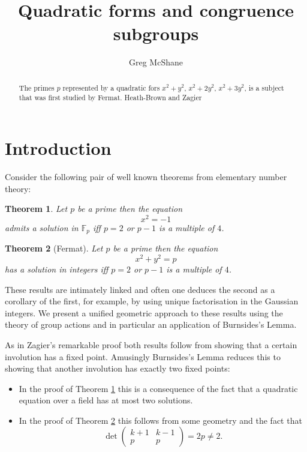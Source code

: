 \documentclass[12pt,a4paper]{amsart}
\title{Quadratic forms and  congruence subgroups}
\author[McShane]{Greg McShane}
\newtheorem{thm}{Theorem}[section]
\def\fp{\mathbb{F}_p}
\begin{document}
\maketitle

\begin{abstract} 
	The  primes $p$  represented by a quadratic fors 
	$x^2 + y^2$, 
	$x^2 + 2y^2$, 
	$x^2 + 3y^2$, 
	is a subject that was first  studied by Fermat. 
	Heath-Brown and Zagier 
\end{abstract} 


\section{Introduction}

Consider the following pair of well known theorems from elementary number theory:


\begin{thm}\label{triv}
Let $p$ be a prime then the equation
$$x^2 = -1$$
admits a solution in $\fp$ iff 
$p =2$ or $p-1$ is a multiple of $4$.
\end{thm}


\begin{thm}[Fermat]\label{main}
Let $p$ be a prime then the equation
$$x^2 + y^2 = p $$
has a solution in integers  iff  $p =2$ or $p-1$ is a multiple of $4$.
\end{thm}

These results are intimately linked and often one deduces the second as a corollary of the first,
 for example, by using unique factorisation in the Gaussian integers.  We present a unified geometric  approach to these results  using the theory of group actions and in particular an application of Burnsides's Lemma. 
 
 
As in Zagier's remarkable proof \cite{zagier} both results follow from showing that a certain involution has a fixed point. Amusingly Burnsides's Lemma reduces this to showing that another involution has exactly two fixed points:
\begin{itemize}
\item  In the proof of Theorem \ref{triv} this is a consequence of the fact that a quadratic equation 
over a field has at most two solutions.
\item In the proof of Theorem \ref{main} this follows from some geometry and the fact that 
$$ \det 
\begin{pmatrix}
k + 1 & k- 1\\
p & p 
\end{pmatrix} = 2p \neq 2.
$$
 \end{itemize}
\end{document}
